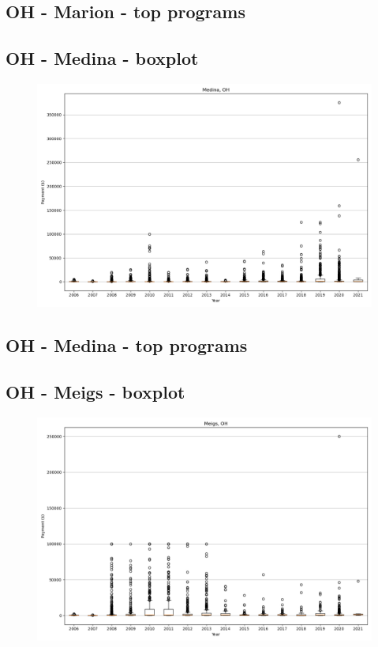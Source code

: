 \subsection*{OH - Marion - top programs}

\newpage
\subsection*{OH - Medina - boxplot}
\begin{figure}[h]
\centering
\includegraphics[width=7in]{../output/boxplots/counties/Medina-OH_boxplot.png}
\end{figure}


\subsection*{OH - Medina - top programs}

\newpage
\subsection*{OH - Meigs - boxplot}
\begin{figure}[h]
\centering
\includegraphics[width=7in]{../output/boxplots/counties/Meigs-OH_boxplot.png}
\end{figure}


